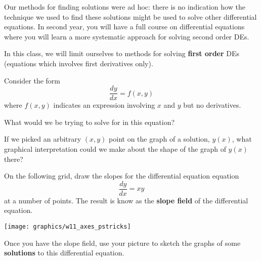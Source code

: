 \documentclass[12pt]{amsart}
\begin{document}
Our methods for finding solutions were ad hoc: there is no indication
how the technique we used to find these solutions might be used to
solve other differential equations.  In second year, you will have a
full course on differential equations where you will learn a more
systematic approach for solving second order DEs.

In this class, we will limit ourselves to methods for solving {\bf
  first order} DEs (equations which involves first derivatives only).

\newpage
 Consider the form
$$\frac{dy}{dx} = f(x,y) $$
where $f(x,y)$ indicates an expression involving $x$ and $y$ but no
derivatives. 

\begin{problem}
What would we be trying to solve for in this equation?
\end{problem}
\vfill

\begin{problem}
 If we picked an arbitrary $(x,y)$ point on the graph of a
  solution, $y(x)$, what graphical interpretation could we make about
  the shape of the graph of $y(x)$ there?
\end{problem}
\vfill

\newpage


\begin{problem}
On the following grid, draw the slopes for the differential equation
equation 
 $$\frac{dy}{dx} = xy$$
 at a number of points.  The result is know as the {\bf slope field}
 of the differential equation. 


\hfill \texttt{[image: graphics/w11\_axes\_pstricks]}

Once you have the slope field, use your picture to 
sketch the graphs
of some {\bf solutions} to this differential equation.
\end{problem}
\end{document}

